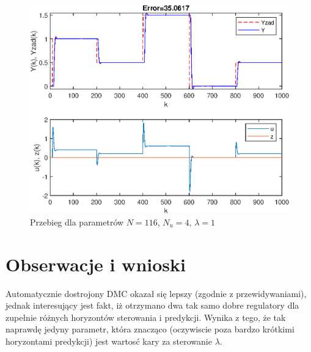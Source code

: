 \begin{figure}
	\centering
	\includegraphics[scale=1]{Rys/przebieg1.eps}
	\caption{Przebieg dla parametrów $N = 116$, $N_u = 4$, $\lambda = 1$}
	\label{fig:przebieg1}
\end{figure}

\section{Obserwacje i wnioski}

Automatycznie dostrojony DMC okazał się lepszy (zgodnie z przewidywaniami), jednak interesujący jest fakt, iż otrzymano dwa tak samo dobre regulatory dla zupełnie różnych horyzontów sterowania i predykcji. Wynika z tego, że tak naprawdę jedyny parametr, która znacząco (oczywiscie poza bardzo krótkimi horyzontami predykcji) jest wartosć kary za sterowanie $\lambda$.
